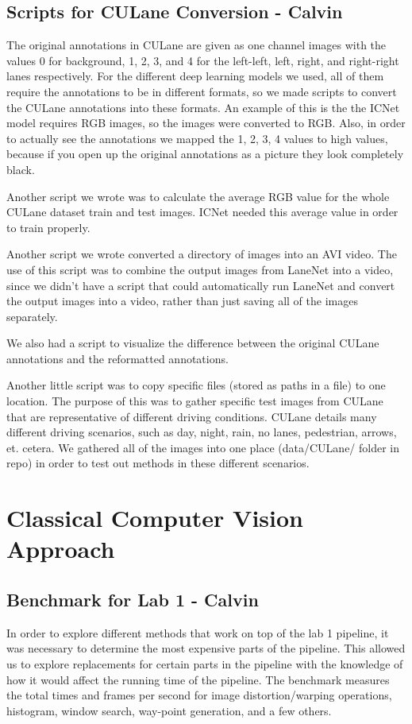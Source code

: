 \documentclass[twoside,twocolumn]{article}
\begin{document}
\subsection{Scripts for CULane Conversion - Calvin}
\par The original annotations in CULane are given as one channel images with the values 0 for background, 1, 2, 3, and 4 for the left-left, left, right, and right-right lanes respectively. For the different deep learning models we used, all of them require the annotations to be in different formats, so we made scripts to convert the CULane annotations into these formats. An example of this is the the ICNet model requires RGB images, so the images were converted to RGB. Also, in order to actually see the annotations we mapped the 1, 2, 3, 4 values to high values, because if you open up the original annotations as a picture they look completely black.
\par Another script we wrote was to calculate the average RGB value for the whole CULane dataset train and test images. ICNet needed this average value in order to train properly.
\par Another script we wrote converted a directory of images into an AVI video. The use of this script was to combine the output images from LaneNet into a video, since we didn't have a script that could automatically run LaneNet and convert the output images into a video, rather than just saving all of the images separately.
\par We also had a script to visualize the difference between the original CULane annotations and the reformatted annotations.
\par Another little script was to copy specific files (stored as paths in a file) to one location. The purpose of this was to gather specific test images from CULane that are representative of different driving conditions. CULane details many different driving scenarios, such as day, night, rain, no lanes, pedestrian, arrows, et. cetera. We gathered all of the images into one place (data/CULane/ folder in repo) in order to test out methods in these different scenarios.



\section{Classical Computer Vision Approach}

\subsection{Benchmark for Lab 1 - Calvin}
\par In order to explore different methods that work on top of the lab 1 pipeline, it was necessary to determine the most expensive parts of the pipeline. This allowed us to explore replacements for certain parts in the pipeline with the knowledge of how it would affect the running time of the pipeline. The benchmark measures the total times and frames per second for image distortion/warping operations, histogram, window search, way-point generation, and a few others.
\end{document}
